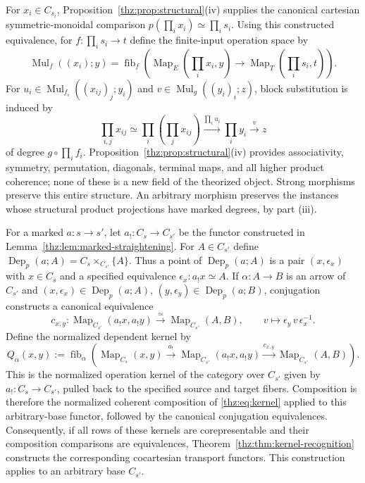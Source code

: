 \documentclass[oneside]{article}
\theoremstyle{plain}
\theoremstyle{definition}
\theoremstyle{remark}
\newcommand{\Dep}{\operatorname{Dep}}
\newcommand{\Map}{\operatorname{Map}}
\newcommand{\fib}{\operatorname{fib}}
\begin{document}
For $x_i\in C_{s_i}$, Proposition~\ref{thz:prop:structural}(iv) supplies
the canonical cartesian symmetric-monoidal comparison $p\!\left(\prod_i x_i\right)\simeq\prod_i s_i.$ Using this constructed equivalence, for $f:\prod_i s_i\to t$ define the
finite-input operation space by
\[
 \operatorname{Mul}_f((x_i);y)=
 \fib_f\left(
  \Map_E\left(\prod_i x_i,y\right)
  \longrightarrow
  \Map_T\left(\prod_i s_i,t\right)
 \right).
\]
For
$u_i\in\operatorname{Mul}_{f_i}((x_{ij})_j;y_i)$ and
$v\in\operatorname{Mul}_g((y_i)_i;z)$, block substitution is induced by
\[
 \prod_{i,j}x_{ij}\simeq
 \prod_i\left(\prod_jx_{ij}\right)
 \xrightarrow{\prod_i u_i}
 \prod_i y_i\xrightarrow{v}z
\]
of degree $g\circ\prod_i f_i$.  Proposition~\ref{thz:prop:structural}(iv)
provides associativity, symmetry, permutation, diagonals, terminal maps,
and all higher product coherence; none of these is a new field of the
theorized object.  Strong morphisms preserve this entire structure.
An arbitrary morphism preserves the instances whose structural product
projections have marked degrees, by part (iii).

For a marked $a:s\to s'$, let
$a_!:C_s\to C_{s'}$ be the functor constructed in
Lemma~\ref{thz:lem:marked-straightening}.  For $A\in C_{s'}$ define $\Dep_p(a;A)=C_s\times_{C_{s'}}\{A\}.$ Thus a point of $\Dep_p(a;A)$ is a pair $(x,\epsilon_x)$ with
$x\in C_s$ and a specified equivalence
$\epsilon_x:a_!x\simeq A$.  If $\alpha:A\to B$ is an arrow of $C_{s'}$ and
$(x,\epsilon_x)\in\Dep_p(a;A)$,
$(y,\epsilon_y)\in\Dep_p(a;B)$, conjugation constructs a canonical
equivalence
\[
 c_{x,y}:\Map_{C_{s'}}(a_!x,a_!y)
 \xrightarrow{\simeq}\Map_{C_{s'}}(A,B),
 \qquad
 v\longmapsto \epsilon_y\,v\,\epsilon_x^{-1}.
\]
Define the normalized dependent kernel by
\[
 Q_\alpha(x,y):=
 \fib_\alpha\!\left(
  \Map_{C_s}(x,y)
  \xrightarrow{a_!}
  \Map_{C_{s'}}(a_!x,a_!y)
  \xrightarrow{c_{x,y}}
  \Map_{C_{s'}}(A,B)
 \right).
\]
This is the normalized operation kernel of the category over $C_{s'}$ given
by $a_!:C_s\to C_{s'}$, pulled back to the specified source and target
fibers.  Composition is therefore the normalized coherent composition of
\eqref{thz:eq:kernel} applied to this arbitrary-base functor, followed by the
canonical conjugation equivalences.  Consequently, if all rows of these
kernels are corepresentable and their composition comparisons are
equivalences, Theorem~\ref{thz:thm:kernel-recognition} constructs the
corresponding cocartesian transport functors. This construction applies
to an arbitrary base $C_{s'}$.
\end{document}
